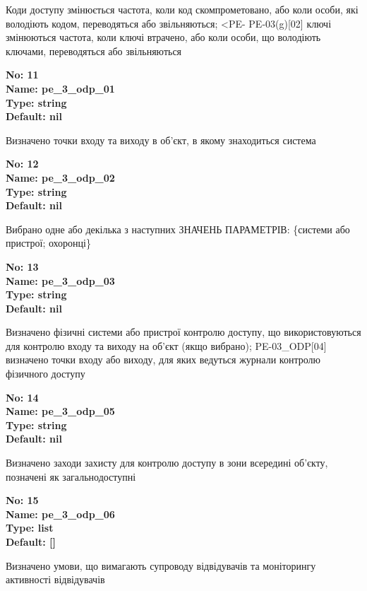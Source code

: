 \documentclass{article}
\begin{document}
{\footnotesize Коди доступу змінюється частота, коли код скомпрометовано, або коли особи, які володіють кодом, переводяться або звільняються; <PE- PE-03(g)[02] ключі змінюються частота, коли ключі втрачено, або коли особи, що володіють ключами, переводяться або звільняються}


{\footnotesize\bfseries
No: 11\\
Name: pe\_\allowbreak{}3\_\allowbreak{}odp\_\allowbreak{}01\\
Type: string\\
Default: nil
}

{\footnotesize Визначено точки входу та виходу в об'єкт, в якому знаходиться система}


{\footnotesize\bfseries
No: 12\\
Name: pe\_\allowbreak{}3\_\allowbreak{}odp\_\allowbreak{}02\\
Type: string\\
Default: nil
}

{\footnotesize Вибрано одне або декілька з наступних ЗНАЧЕНЬ ПАРАМЕТРІВ: \{системи або пристрої; охоронці\}}


{\footnotesize\bfseries
No: 13\\
Name: pe\_\allowbreak{}3\_\allowbreak{}odp\_\allowbreak{}03\\
Type: string\\
Default: nil
}

{\footnotesize Визначено фізичні системи або пристрої контролю доступу, що використовуються для контролю входу та виходу на об'єкт (якщо вибрано); PE-03\_\allowbreak{}ODP[04] визначено точки входу або виходу, для яких ведуться журнали контролю фізичного доступу}


{\footnotesize\bfseries
No: 14\\
Name: pe\_\allowbreak{}3\_\allowbreak{}odp\_\allowbreak{}05\\
Type: string\\
Default: nil
}

{\footnotesize Визначено заходи захисту для контролю доступу в зони всередині об'єкту, позначені як загальнодоступні}


{\footnotesize\bfseries
No: 15\\
Name: pe\_\allowbreak{}3\_\allowbreak{}odp\_\allowbreak{}06\\
Type: list\\
Default: []
}

{\footnotesize Визначено умови, що вимагають супроводу відвідувачів та моніторингу активності відвідувачів}
\end{document}
